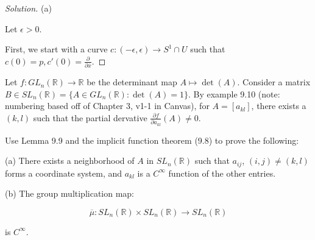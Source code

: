 \documentclass[10pt]{article}
\theoremstyle{nonumberplain}%
\newenvironment{problem}[2][]{\begin{trivlist}
\item[\hskip \labelsep {\bfseries #1}\hskip \labelsep {\bfseries #2.}]}{\end{trivlist}}
\begin{document}
\begin{proof}[Solution]

(a)

Let $\epsilon > 0$.

First, we start with a curve $c: (-\epsilon, \epsilon ) \to S^1 \cap U$ such that $c(0) = p, c'(0) = \frac{\partial}{\partial \overline{x}} $.

\end{proof}

\begin{problem}{Question 4}

Let $f: GL_n(\mathbb{R}) \to \mathbb{R}$ be the determinant map $A \mapsto \det(A)$. Consider a matrix $B \in SL_n(\mathbb{R}) = \{ A \in GL_n(\mathbb{R}) : \det(A) = 1 \}$. By example 9.10 (note: numbering based off of Chapter 3, v1-1 in Canvas), for $A = [ a_{kl}]$, there exists a $(k, l)$ such that the partial dervative $\frac{\partial f}{ \partial a_{kl}}(A) \not = 0$. 

Use Lemma 9.9 and the implicit function theorem (9.8) to prove the following:

(a) There exists a neighborhood of $A$ in $SL_n(\mathbb{R})$ such that $a_{ij}$, $(i,j) \not = (k,l)$ forms a coordinate system, and $a_{kl}$ is a $C^\infty$ function of the other entries.

(b) The group multiplication map:

$$\overline{\mu}: SL_n(\mathbb{R}) \times SL_n(\mathbb{R}) \to SL_n(\mathbb{R})$$

is $C^\infty$.


\end{problem}
\end{document}
